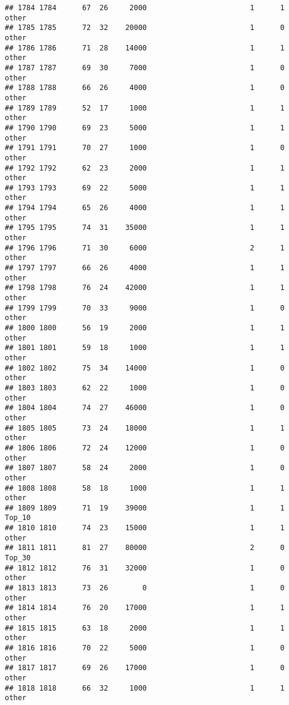 \documentclass[
]{article}
\begin{document}
\begin{verbatim}
## 1784 1784      67  26     2000                        1      1    other
## 1785 1785      72  32    20000                        1      0    other
## 1786 1786      71  28    14000                        1      1    other
## 1787 1787      69  30     7000                        1      0    other
## 1788 1788      66  26     4000                        1      0    other
## 1789 1789      52  17     1000                        1      1    other
## 1790 1790      69  23     5000                        1      1    other
## 1791 1791      70  27     1000                        1      0    other
## 1792 1792      62  23     2000                        1      1    other
## 1793 1793      69  22     5000                        1      1    other
## 1794 1794      65  26     4000                        1      1    other
## 1795 1795      74  31    35000                        1      1    other
## 1796 1796      71  30     6000                        2      1    other
## 1797 1797      66  26     4000                        1      1    other
## 1798 1798      76  24    42000                        1      1    other
## 1799 1799      70  33     9000                        1      0    other
## 1800 1800      56  19     2000                        1      1    other
## 1801 1801      59  18     1000                        1      1    other
## 1802 1802      75  34    14000                        1      0    other
## 1803 1803      62  22     1000                        1      0    other
## 1804 1804      74  27    46000                        1      0    other
## 1805 1805      73  24    18000                        1      1    other
## 1806 1806      72  24    12000                        1      0    other
## 1807 1807      58  24     2000                        1      0    other
## 1808 1808      58  18     1000                        1      1    other
## 1809 1809      71  19    39000                        1      1   Top_10
## 1810 1810      74  23    15000                        1      1    other
## 1811 1811      81  27    80000                        2      0   Top_30
## 1812 1812      76  31    32000                        1      0    other
## 1813 1813      73  26        0                        1      0    other
## 1814 1814      76  20    17000                        1      1    other
## 1815 1815      63  18     2000                        1      1    other
## 1816 1816      70  22     5000                        1      0    other
## 1817 1817      69  26    17000                        1      0    other
## 1818 1818      66  32     1000                        1      1    other

\end{verbatim}
\end{document}

